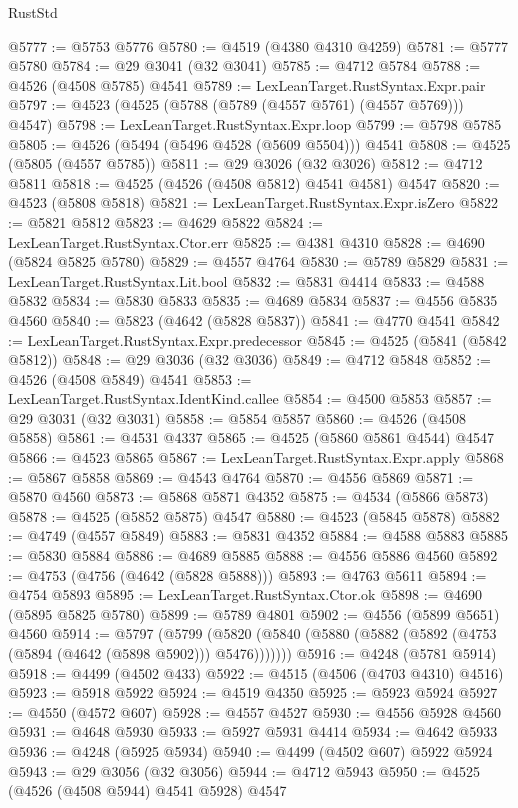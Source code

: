 \begin{lexlean}{RustStd}
\begin{coremodule}
@5777 := @5753 @5776
@5780 := @4519 (@4380 @4310 @4259)
@5781 := @5777 @5780
@5784 := @29 @3041 (@32 @3041)
@5785 := @4712 @5784
@5788 := @4526 (@4508 @5785) @4541
@5789 := LexLeanTarget.RustSyntax.Expr.pair
@5797 := @4523 (@4525 (@5788 (@5789 (@4557 @5761) (@4557 @5769))) @4547)
@5798 := LexLeanTarget.RustSyntax.Expr.loop
@5799 := @5798 @5785
@5805 := @4526 (@5494 (@5496 @4528 (@5609 @5504))) @4541
@5808 := @4525 (@5805 (@4557 @5785))
@5811 := @29 @3026 (@32 @3026)
@5812 := @4712 @5811
@5818 := @4525 (@4526 (@4508 @5812) @4541 @4581) @4547
@5820 := @4523 (@5808 @5818)
@5821 := LexLeanTarget.RustSyntax.Expr.isZero
@5822 := @5821 @5812
@5823 := @4629 @5822
@5824 := LexLeanTarget.RustSyntax.Ctor.err
@5825 := @4381 @4310
@5828 := @4690 (@5824 @5825 @5780)
@5829 := @4557 @4764
@5830 := @5789 @5829
@5831 := LexLeanTarget.RustSyntax.Lit.bool
@5832 := @5831 @4414
@5833 := @4588 @5832
@5834 := @5830 @5833
@5835 := @4689 @5834
@5837 := @4556 @5835 @4560
@5840 := @5823 (@4642 (@5828 @5837))
@5841 := @4770 @4541
@5842 := LexLeanTarget.RustSyntax.Expr.predecessor
@5845 := @4525 (@5841 (@5842 @5812))
@5848 := @29 @3036 (@32 @3036)
@5849 := @4712 @5848
@5852 := @4526 (@4508 @5849) @4541
@5853 := LexLeanTarget.RustSyntax.IdentKind.callee
@5854 := @4500 @5853
@5857 := @29 @3031 (@32 @3031)
@5858 := @5854 @5857
@5860 := @4526 (@4508 @5858)
@5861 := @4531 @4337
@5865 := @4525 (@5860 @5861 @4544) @4547
@5866 := @4523 @5865
@5867 := LexLeanTarget.RustSyntax.Expr.apply
@5868 := @5867 @5858
@5869 := @4543 @4764
@5870 := @4556 @5869
@5871 := @5870 @4560
@5873 := @5868 @5871 @4352
@5875 := @4534 (@5866 @5873)
@5878 := @4525 (@5852 @5875) @4547
@5880 := @4523 (@5845 @5878)
@5882 := @4749 (@4557 @5849)
@5883 := @5831 @4352
@5884 := @4588 @5883
@5885 := @5830 @5884
@5886 := @4689 @5885
@5888 := @4556 @5886 @4560
@5892 := @4753 (@4756 (@4642 (@5828 @5888)))
@5893 := @4763 @5611
@5894 := @4754 @5893
@5895 := LexLeanTarget.RustSyntax.Ctor.ok
@5898 := @4690 (@5895 @5825 @5780)
@5899 := @5789 @4801
@5902 := @4556 (@5899 @5651) @4560
@5914 := @5797
    (@5799 (@5820 (@5840 (@5880 (@5882 (@5892 (@4753 (@5894 (@4642 (@5898 @5902))) @5476)))))))
@5916 := @4248 (@5781 @5914)
@5918 := @4499 (@4502 @433)
@5922 := @4515 (@4506 (@4703 @4310) @4516)
@5923 := @5918 @5922
@5924 := @4519 @4350
@5925 := @5923 @5924
@5927 := @4550 (@4572 @607)
@5928 := @4557 @4527
@5930 := @4556 @5928 @4560
@5931 := @4648 @5930
@5933 := @5927 @5931 @4414
@5934 := @4642 @5933
@5936 := @4248 (@5925 @5934)
@5940 := @4499 (@4502 @607) @5922 @5924
@5943 := @29 @3056 (@32 @3056)
@5944 := @4712 @5943
@5950 := @4525 (@4526 (@4508 @5944) @4541 @5928) @4547

\end{coremodule}
\end{lexlean}
